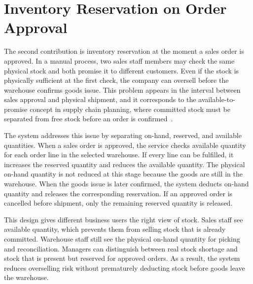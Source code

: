 \section{Inventory Reservation on Order Approval}
The second contribution is inventory reservation at the moment a sales order is
approved. In a manual process, two sales staff members may check the same
physical stock and both promise it to different customers. Even if the stock is
physically sufficient at the first check, the company can oversell before the
warehouse confirms goods issue. This problem appears in the interval between
sales approval and physical shipment, and it corresponds to the
available-to-promise concept in supply chain planning, where committed stock must
be separated from free stock before an order is confirmed~\cite{chopra2019supply}.

The system addresses this issue by separating on-hand, reserved, and available
quantities. When a sales order is approved, the service checks available
quantity for each order line in the selected warehouse. If every line can be
fulfilled, it increases the reserved quantity and reduces the available quantity.
The physical on-hand quantity is not reduced at this stage because the goods are
still in the warehouse. When the goods issue is later confirmed, the system
deducts on-hand quantity and releases the corresponding reservation. If an
approved order is cancelled before shipment, only the remaining reserved
quantity is released.

This design gives different business users the right view of stock. Sales staff
see available quantity, which prevents them from selling stock that is already
committed. Warehouse staff still see the physical on-hand quantity for picking
and reconciliation. Managers can distinguish between real stock shortage and
stock that is present but reserved for approved orders. As a result, the system
reduces overselling risk without prematurely deducting stock before goods leave
the warehouse.

